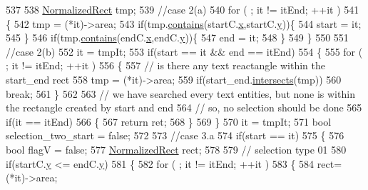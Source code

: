 \begin{DoxyCode}
537 
538     \hyperlink{classOkular_1_1NormalizedRect}{NormalizedRect} tmp;
539     \textcolor{comment}{//case 2(a)}
540     \textcolor{keywordflow}{for} ( ; it != itEnd; ++it )
541     \{
542         tmp = (*it)->area;
543         \textcolor{keywordflow}{if}(tmp.\hyperlink{classOkular_1_1NormalizedRect_ad9373aab8c5c6369cb0a9cbed2749d9b}{contains}(startC.\hyperlink{classOkular_1_1NormalizedPoint_a857f49b9bc7712430d167472ef9dbd94}{x},startC.\hyperlink{classOkular_1_1NormalizedPoint_ac2276daabda627d5f82bb1532c293047}{y}))\{
544             start = it;
545         \}
546         \textcolor{keywordflow}{if}(tmp.\hyperlink{classOkular_1_1NormalizedRect_ad9373aab8c5c6369cb0a9cbed2749d9b}{contains}(endC.\hyperlink{classOkular_1_1NormalizedPoint_a857f49b9bc7712430d167472ef9dbd94}{x},endC.\hyperlink{classOkular_1_1NormalizedPoint_ac2276daabda627d5f82bb1532c293047}{y}))\{
547             end = it;
548         \}
549     \}
550 
551     \textcolor{comment}{//case 2(b)}
552     it = tmpIt;
553     \textcolor{keywordflow}{if}(start == it && end == itEnd)
554     \{
555         \textcolor{keywordflow}{for} ( ; it != itEnd; ++it )
556         \{
557             \textcolor{comment}{// is there any text reactangle within the start\_end rect}
558             tmp = (*it)->area;
559             \textcolor{keywordflow}{if}(start\_end.\hyperlink{classOkular_1_1NormalizedRect_a9c2d89ccafd17802316c90406c6ec756}{intersects}(tmp))
560                 \textcolor{keywordflow}{break};
561         \}
562 
563         \textcolor{comment}{// we have searched every text entities, but none is within the rectangle created by start and end}
564         \textcolor{comment}{// so, no selection should be done}
565         \textcolor{keywordflow}{if}(it == itEnd)
566         \{
567             \textcolor{keywordflow}{return} ret;
568         \}
569     \}
570     it = tmpIt;
571     \textcolor{keywordtype}{bool} selection\_two\_start = \textcolor{keyword}{false};
572 
573     \textcolor{comment}{//case 3.a}
574     \textcolor{keywordflow}{if}(start == it)
575     \{
576         \textcolor{keywordtype}{bool} flagV = \textcolor{keyword}{false};
577         \hyperlink{classOkular_1_1NormalizedRect}{NormalizedRect} rect;
578 
579         \textcolor{comment}{// selection type 01}
580         \textcolor{keywordflow}{if}(startC.\hyperlink{classOkular_1_1NormalizedPoint_ac2276daabda627d5f82bb1532c293047}{y} <= endC.\hyperlink{classOkular_1_1NormalizedPoint_ac2276daabda627d5f82bb1532c293047}{y})
581         \{
582             \textcolor{keywordflow}{for} ( ; it != itEnd; ++it )
583             \{
584                 rect= (*it)->area;

\end{DoxyCode}
